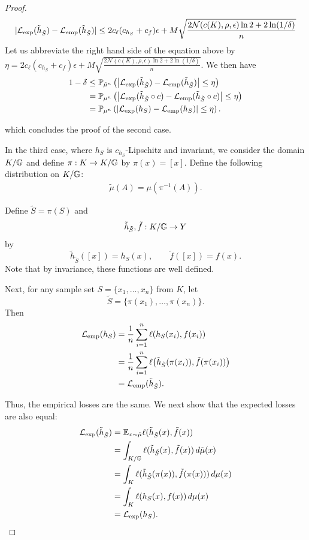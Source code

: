 \documentclass{article}
\begin{document}
\begin{proof}
    \begin{align*}
        |\mathcal{L}_{\mathrm{exp}}(\tilde{h}_{\tilde S}) - \mathcal{L}_{\mathrm{emp}}(\tilde{h}_{\tilde S})| \le 2c_\ell (c_{h_S}+c_f)\epsilon+M \sqrt{\frac{2\mathcal{N}( c(K), \rho,\epsilon)\ln 2 + 2 \ln(1/\delta)}{n}}
    \end{align*}
    Let us abbreviate the right hand side of the equation above by $\eta=2c_\ell (c_{h_S}+c_f)\epsilon+M \sqrt{\frac{2\mathcal{N}( c(K), \rho,\epsilon)\ln 2 + 2 \ln(1/\delta)}{n}}$. We then have 
\begin{align*}
1-\delta
&\leq
\mathbb{P}_{\tilde{\mu}^n}
\left(
\left|
\mathcal{L}_{\mathrm{exp}}(\tilde h_{\tilde S})
-
\mathcal{L}_{\mathrm{emp}}(\tilde h_{\tilde S})
\right|
\leq \eta
\right)\\
&=
\mathbb{P}_{\mu^n}
\left(
\left|
\mathcal{L}_{\mathrm{exp}}(\tilde h_{\tilde S}\circ c)
-
\mathcal{L}_{\mathrm{emp}}(\tilde h_{\tilde S}\circ c)
\right|
\leq \eta
\right)\\
&=
\mathbb{P}_{\mu^n}
\left(
\left|
\mathcal{L}_{\mathrm{exp}}(h_S)
-
\mathcal{L}_{\mathrm{emp}}(h_S)
\right|
\leq \eta
\right).
\end{align*}


which concludes the proof of the second case.

In the third case, where $h_S$ is $c_{h_S}$-Lipschitz and invariant, we consider the domain $K/\mathbb{G}$ and define $\pi:K\to K/\mathbb{G}$ by $\pi(x)=[x]$. Define the following distribution on $K/\mathbb{G}$:
\begin{align*}
    \tilde{\mu}(A)=\mu(\pi^{-1}(A)).
\end{align*}

Define $\tilde S=\pi(S)$ and
\[
\tilde{h}_{\tilde S},\tilde{f}:K/\mathbb{G}\to Y
\]
by
\[
\tilde{h}_{\tilde S}([x])=h_S(x),
\qquad
\tilde{f}([x])=f(x).
\]
Note that by invariance, these functions are well defined.

Next, for any sample set $S=\{x_1,\ldots,x_n\}$ from $K$, let
\[
\tilde S=\{\pi(x_1),\ldots,\pi(x_n)\}.
\]
Then
\begin{align*}
\mathcal{L}_{\mathrm{emp}}(h_S)
&=
\frac{1}{n}\sum_{i=1}^n \ell(h_S(x_i),f(x_i))\\
&=
\frac{1}{n}\sum_{i=1}^n
\ell\bigl(\tilde{h}_{\tilde S}(\pi(x_i)),
          \tilde{f}(\pi(x_i))\bigr)\\
&=
\mathcal{L}_{\mathrm{emp}}(\tilde{h}_{\tilde S}).
\end{align*}

Thus, the empirical losses are the same. We next show that the expected losses are also equal:
\begin{align*}
\mathcal{L}_{\mathrm{exp}}(\tilde{h}_{\tilde S})
&=
\mathbb{E}_{x\sim\tilde{\mu}}
\ell(\tilde{h}_{\tilde S}(x),\tilde{f}(x))\\
&=
\int_{K/\mathbb{G}}
\ell(\tilde{h}_{\tilde S}(x),\tilde{f}(x))
\,d\tilde{\mu}(x)\\
&=
\int_K
\ell(\tilde{h}_{\tilde S}(\pi(x)),
     \tilde{f}(\pi(x)))
\,d\mu(x)\\
&=
\int_K
\ell(h_S(x),f(x))
\,d\mu(x)\\
&=
\mathcal{L}_{\mathrm{exp}}(h_S).
\end{align*}


\end{proof}
\end{document}
